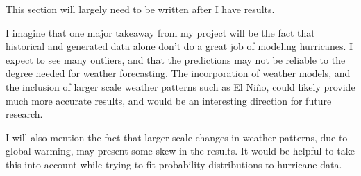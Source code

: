 
\par
This section will largely need to be written after I have results.

\par
I imagine that one major takeaway from my project will be the fact that historical and generated data alone don't do a great job of modeling hurricanes.
I expect to see many outliers, and that the predictions may not be reliable to the degree needed for weather forecasting.
The incorporation of weather models, and the inclusion of larger scale weather patterns such as El Ni\~{n}o, could likely provide much more accurate results, and would be an interesting direction for future research.

\par
I will also mention the fact that larger scale changes in weather patterns, due to global warming, may present some skew in the results.
It would be helpful to take this into account while trying to fit probability distributions to hurricane data.